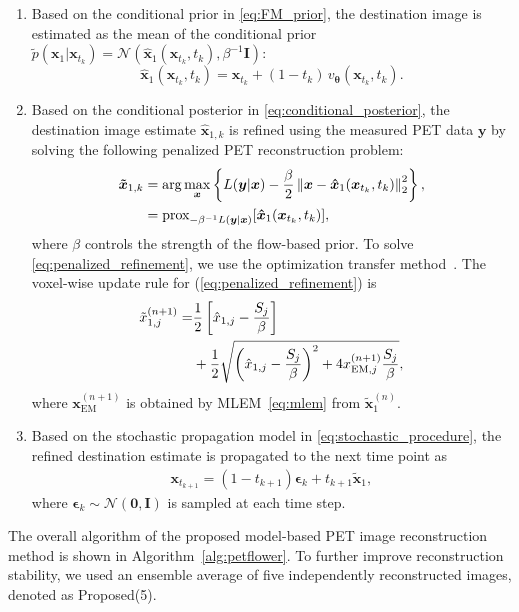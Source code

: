 \documentclass[journal]{IEEEtran}
\begin{document}
\begin{enumerate}
\item Based on the conditional prior in \eqref{eq:FM_prior}, the destination image is estimated as the mean of the conditional
prior $\tilde{p}(\bm x_1 | \bm x_{t_k}) = \mathcal{N}(\hat{\bm x}_1(\bm x_{t_k},t_k), \beta^{-1} \bm I)$:
\begin{equation}
\bm{\hat{x}}_1(\bm{x}_{t_k}, t_k) = \bm{x}_{t_k} + (1-t_k)\,v_{\bm{\theta}}(\bm{x}_{t_k},t_k).
\label{eq:destination_estimation}
\end{equation}
\item Based on the conditional posterior in \eqref{eq:conditional_posterior}, the destination image estimate $\hat{\bm x}_{1,k}$ is refined using the measured PET data $\bm y$ by solving the following penalized PET reconstruction problem:
\begin{align}
\bm{\tilde{x}}_{1,k} &= \arg\max_{\bm{x}} \left\{ L(\bm{y}|\bm{x}) - \frac{\beta}{2} \left\|\bm{x}-\bm{\hat{x}}_1(\bm{x}_{t_k}, t_k)\right\|_2^2 \right\}, \notag \\
&= \text{prox}_{-\beta^{-1} L(\bm{y}|\bm{x}) }[ \bm{\hat{x}}_1(\bm{x}_{t_k}, t_k) ],
\label{eq:penalized_refinement} 
\end{align}
where $\beta$ controls the strength of the flow-based prior.
To solve \eqref{eq:penalized_refinement}, we use the optimization transfer method~\cite{Langed2000, Wang2012}. The voxel-wise update rule for (\ref{eq:penalized_refinement}) is
\begin{align}
\tilde{x}_{1,j}^{(n+1)} =& \frac{1}{2} \left[ \hat{x}_{1,j} - \frac{S_j}{\beta} \right] \notag\\
&+ \frac{1}{2} \sqrt{\left( \hat{x}_{1,j} - \frac{S_j}{\beta} \right)^2 + 4x_{\mathrm{EM},j}^{(n+1)}\frac{S_j}{\beta} },
\label{eq:closed_form_update}
\end{align}
where $\bm x_{\mathrm{EM}}^{(n+1)}$ is obtained by MLEM~\eqref{eq:mlem} from $\tilde{\bm x}_{1}^{(n)}$.
\item Based on the stochastic propagation model in \eqref{eq:stochastic_procedure}, the refined destination estimate is propagated to the next time point as
\begin{align}
\bm x_{t_{k+1}} = (1-t_{k+1}) \bm \epsilon_k + t_{k+1} \bm{\tilde{x}}_1,
\end{align}
where $\bm\epsilon_k \sim \mathcal{N}(\bm 0,\bm I)$ is sampled at each time step.
\end{enumerate}

The overall algorithm of the proposed model-based PET image reconstruction method is shown in Algorithm~\ref{alg:petflower}. To further improve reconstruction stability, we used an ensemble average of five independently reconstructed images, denoted as Proposed(5).
\end{document}
